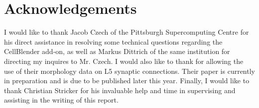 \documentclass[a4paper]{article}
\begin{document}
\section{Acknowledgements}
I would like to thank Jacob Czech of the Pittsburgh Supercomputing Centre for his direct assistance in resolving some technical questions regarding the CellBlender add-on, as well as Markus Dittrich of the same institution for directing my inquires to Mr. Czech. I would also like to thank \cite{Rollehagen::2015} for allowing the use of their morphology data on L5 synaptic connections. Their paper is currently in preparation and is due to be published later this year. Finally, I would like to thank Christian Stricker for his invaluable help and time in supervising and assisting in the writing of this report.

{}

\end{document}
